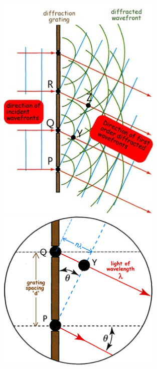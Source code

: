	\begin{figure}[!htbp]
		\begin{minipage}[c]{0.5\linewidth}
			\centering
			\includegraphics[width=0.7\textwidth]{../Images/grating_to_split_light.jpg}
			\caption{\label{fig:grating_to_split_light}}
		\end{minipage}
		\begin{minipage}[c]{0.5\linewidth}
			\centering
			\includegraphics[width=0.7\textwidth]{../Images/grating_close_up.png}
			\caption{\label{fig:grating_close_up}}
		\end{minipage}
	\end{figure}

